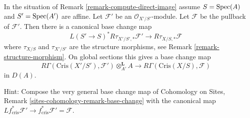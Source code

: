 \begin{remark}
\label{remark-base-change}
In the situation of Remark \ref{remark-compute-direct-image}
assume $S = \mathop{\mathrm{Spec}}(A)$ and $S' = \mathop{\mathrm{Spec}}(A')$ are affine.
Let $\mathcal{F}'$ be an $\mathcal{O}_{X'/S'}$-module.
Let $\mathcal{F}$ be the pullback of $\mathcal{F}'$.
Then there is a canonical base change map
$$
L(S' \to S)^*R\tau_{X'/S', *}\mathcal{F}'
\longrightarrow
R\tau_{X/S, *}\mathcal{F}
$$
where $\tau_{X/S}$ and $\tau_{X'/S'}$ are the structure morphisms, see
Remark \ref{remark-structure-morphism}. On global sections this
gives a base change map
\begin{equation}
\label{equation-base-change-map}
R\Gamma(\text{Cris}(X'/S'), \mathcal{F}') \otimes^\mathbf{L}_{A'} A
\longrightarrow
R\Gamma(\text{Cris}(X/S), \mathcal{F})
\end{equation}
in $D(A)$.

\medskip\noindent
Hint: Compose the very general base change map of
Cohomology on Sites, Remark \ref{sites-cohomology-remark-base-change}
with the canonical map
$Lf_{\text{cris}}^*\mathcal{F}' \to
f_{\text{cris}}^*\mathcal{F}' = \mathcal{F}$.
\end{remark}

